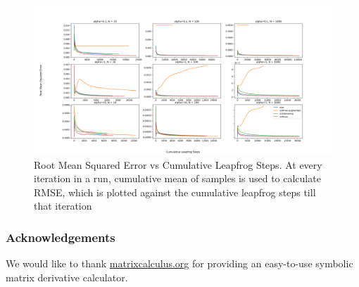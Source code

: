 \documentclass[11pt]{article}
\begin{document}
\begin{figure}[t!]
    \centering
    \includegraphics[width=1.2\textwidth]{figures/simplex/rmse.png}
    \caption{Root Mean Squared Error vs Cumulative Leapfrog Steps. At every iteration in a run, cumulative mean of samples is used to calculate RMSE, which is plotted against the cumulative leapfrog steps till that iteration}
    \label{fig:rmse}
\end{figure}

\subsubsection*{Acknowledgements}

We would like to thank \url{matrixcalculus.org} for providing an
easy-to-use symbolic matrix derivative calculator.



{}



\end{document}
